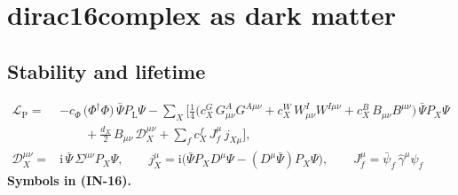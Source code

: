 \documentclass[
  10pt,
]{article}
\begin{document}
\hypertarget{dirac16complex-as-dark-matter}{%
\section{dirac16complex as dark
matter}\label{dirac16complex-as-dark-matter}}

\hypertarget{stability-and-lifetime}{%
\subsection{Stability and lifetime}\label{stability-and-lifetime}}

\[
\begin{aligned}
\mathcal{L}_{\mathrm{P}} = {}&-c_\Phi\,\big(\Phi^\dagger\Phi\big)\,\bar\Psi P_{\mathrm{L}}\Psi
 - \sum_{X}\Big[\frac14\big(c^{G}_X\,G^A_{\mu\nu}G^{A\mu\nu} + c^{W}_X\,W^I_{\mu\nu}W^{I\mu\nu}
 + c^{B}_X\,B_{\mu\nu}B^{\mu\nu}\big)\,\bar\Psi P_X\Psi\\
&\qquad + \frac{d_X}{2}\,B_{\mu\nu}\,\mathcal{D}_X^{\mu\nu} + \sum_{f} c^{f}_X\,J_f^\mu\,j_{X\mu}\Big],\\
\mathcal{D}_X^{\mu\nu} = {}&\mathrm{i}\,\bar\Psi\,\Sigma^{\mu\nu}P_X\Psi,\qquad
j_X^\mu = \mathrm{i}\big(\bar\Psi P_X D^\mu\Psi - (D^\mu\bar\Psi)P_X\Psi\big),\qquad
J_f^\mu = \bar\psi_f\,\hat\gamma^\mu\psi_f
\end{aligned} \tag{IN-16}
\] \textbf{Symbols in (IN-16).}
\end{document}
